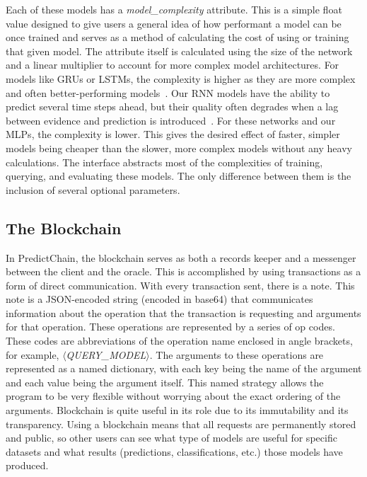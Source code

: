 \documentclass{ledger}
\begin{document}
Each of these models has a \textit{model\_complexity} attribute.  This is a simple float value designed to give users
a general idea of how performant a model can be once trained and serves as a method of calculating the cost of using
or training that given model.  The attribute itself is calculated using the size of the network and a linear multiplier to
account for more complex model architectures.  For models like GRUs or LSTMs, the complexity is higher as they are more
complex and often better-performing models~\cite{recurrentModeling}.  Our RNN models have the ability to
predict several time steps ahead, but their quality often degrades when a lag between evidence and prediction is
introduced~\cite{weightGuessing}.  For these networks and our MLPs, the complexity is lower. This gives the desired
effect of faster, simpler models being cheaper than the slower, more complex models without any heavy calculations.
The interface abstracts most of the complexities of training, querying, and evaluating these models. The only difference
between them is the inclusion of several optional parameters.

\subsection{The Blockchain}

In PredictChain, the blockchain serves as both a records keeper and a messenger between the client and the oracle.
This is accomplished by using transactions as a form of direct communication.  With every transaction sent, there is a note.
This note is a JSON-encoded string (encoded in base64) that communicates information about the operation that the transaction
is requesting and arguments for that operation.  These operations are represented by a series
of op codes.  These codes are abbreviations of the operation name enclosed in angle brackets, for example,
$\langle$\textit{QUERY\_MODEL}$\rangle$.  The arguments to these operations are represented as a named dictionary, with
each key being the name of the argument and each value being the argument itself.  This named strategy allows the program
to be very flexible without worrying about the exact ordering of the arguments.  Blockchain is quite useful in its role
due to its immutability and its transparency.  Using a blockchain means that all requests are permanently stored and
public, so other users can see what type of models are useful for specific datasets and what results (predictions,
classifications, etc.) those models have produced.
\end{document}
